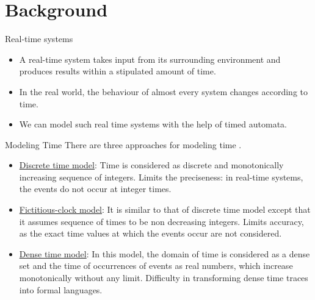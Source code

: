 \documentclass[10pt]{beamer}
\theoremstyle{plain}
\theoremstyle{definition}
\begin{document}
\section{Background}

\begin{frame}{Real-time systems}
	\begin{itemize}
		\item A real-time system takes input from its surrounding environment and produces results within a stipulated amount of time.
		\item In the real world, the behaviour of almost every system changes according to time.
		\item We can model such real time systems with the help of timed automata.
	\end{itemize}
\end{frame}

\begin{frame}{Modeling Time}
	There are three approaches for modeling time \cite{Alur:1994:TTA:180782.180519}.
		\begin{itemize}		
		\item \underline{Discrete time model}: Time is considered as discrete and monotonically increasing sequence of integers. Limits the preciseness: in real-time systems, the events do not occur at integer times.
		\pause
		\item \underline{Fictitious-clock model}: It is similar to that of discrete time model except that it assumes sequence of times to be non decreasing integers. Limits accuracy, as the exact time values at which the events occur are not considered. 
		\pause
		\item \underline{Dense time model}: In this model, the domain of time is considered as a dense set and the time of occurrences of events as real numbers, which increase monotonically without any limit. Difficulty in transforming dense time traces into formal languages.
	\end{itemize}
\end{frame}
\end{document}
